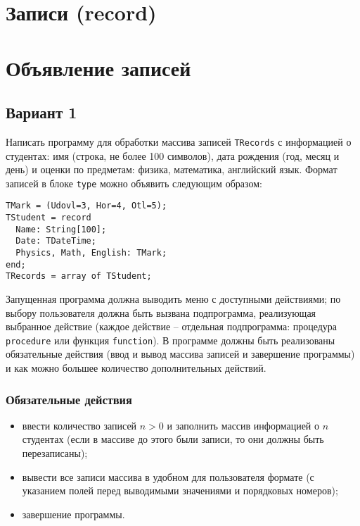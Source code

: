 \documentclass[12pt,a4paper]{report}
\begin{document}
\section*{Записи (record)}
\section*{Объявление записей}

\clearpage




\subsection*{Вариант 1}
Написать программу для обработки массива записей \texttt{TRecords} с информацией о студентах: имя (строка, не более 100 символов), дата рождения (год, месяц и день) и оценки по предметам: физика, математика, английский язык.
Формат записей в блоке \texttt{type} можно объявить следующим образом:
\begin{verbatim}
TMark = (Udovl=3, Hor=4, Otl=5);
TStudent = record
  Name: String[100];
  Date: TDateTime;
  Physics, Math, English: TMark;
end;
TRecords = array of TStudent;
\end{verbatim}

Запущенная программа должна выводить меню с доступными действиями; по выбору пользователя должна быть вызвана подпрограмма, реализующая выбранное действие (каждое действие -- отдельная подпрограмма: процедура \texttt{procedure} или функция \texttt{function}). В программе должны быть реализованы обязательные действия (ввод и вывод массива записей и завершение программы) и как можно большее количество дополнительных действий. 

\subsubsection*{Обязательные действия}
\begin{itemize}
\item ввести количество записей $n > 0$ и заполнить массив информацией о $n$ студентах (если в массиве до этого были записи, то они должны быть перезаписаны);
\item вывести все записи массива в удобном для пользователя формате (с указанием полей перед выводимыми значениями и порядковых номеров);
\item завершение программы.
\end{itemize}
\end{document}
